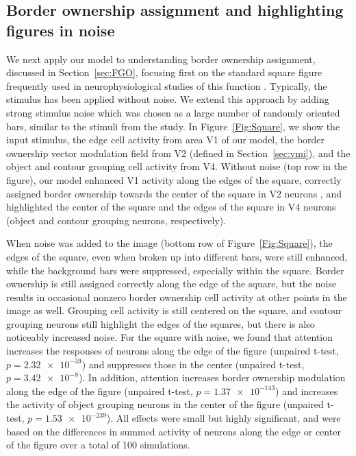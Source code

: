 \subsection{Border ownership assignment and highlighting figures in noise}
\label{sec:BOS}
We next apply our model to understanding border ownership assignment,
discussed in Section~\ref{sec:FGO}, focusing first on the standard square figure frequently used in neurophysiological studies of this function \citep{Zhou_etal00,Qiu_etal07,Sugihara_etal11,Williford_vonderHeydt13,Williford_vonderHeydt14,Martin_vonderHeydt15}. Typically, the stimulus has been applied without noise. We extend this approach by adding strong stimulus noise which was chosen as a large number of randomly oriented bars, similar to the stimuli from the \cite{Chen_etal14} study. In Figure~\ref{Fig:Square}, we show the input stimulus, the edge cell activity from area V1 of our model, the border ownership vector modulation field from V2 (defined in Section~\ref{sec:vmi}), and the object and contour grouping cell activity from V4.  Without noise (top row in the figure), our model enhanced V1 activity along the edges of the square, correctly assigned border ownership towards the center of the square in V2 neurons \citep[in agreement with][] {Zhou_etal00}, and highlighted the center of the square and the edges of the square in V4 neurons (object and contour grouping neurons, respectively).

When noise was added to the image (bottom row of Figure~\ref{Fig:Square}), the edges of the square, even when broken up
into different bars, were still enhanced, while the background bars were suppressed, especially within the square. Border ownership is still assigned correctly along the edge of the square, but the noise results in occasional nonzero border ownership cell activity at other points in the image as well. Grouping cell activity is still centered on the square, and contour grouping neurons still highlight the edges of the squares, but there is also noticeably increased noise. For the square with noise, we found that attention increases the responses of neurons along the edge of the figure (unpaired t-test, $p=\num{2.32e-59}$) and suppresses those in the center (unpaired t-test, $p=\num{3.42e-8}$). In addition, attention increases border
ownership modulation along the edge of the figure (unpaired t-test,
$p=\num{1.37e-143}$) and increases the activity of object grouping
neurons in the center of the figure (unpaired t-test, $p=\num{1.53e-239}$). All effects were small but highly significant,
and were based on the differences in summed activity of neurons along
the edge or center of the figure over a total of 100 simulations.

